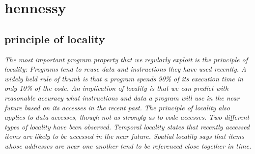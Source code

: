 \section{hennessy}
\subsection{principle of locality}
\textit{The	most important program property that we regularly exploit is the principle of
	locality: Programs tend to reuse data and instructions they have used recently. A
	widely held rule of thumb is that a program spends 90\% of its execution time in
	only 10\% of the code. An implication of locality is that we can predict with reasonable
	accuracy what instructions and data a program will use in the near future
	based on its accesses in the recent past. The principle of locality also applies to
	data accesses, though not as strongly as to code accesses.
	Two different types of locality have been observed. Temporal locality states
	that recently accessed items are likely to be accessed in the near future. Spatial
	locality says that items whose addresses are near one another tend to be referenced
	close together in time.}

